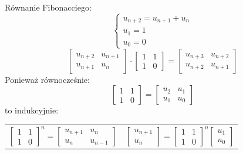 \documentclass[handout]{beamer}
\theoremstyle{definition}
\theoremstyle{named}
\begin{document}
\begin{frame}{Równanie Fibonacciego:}
\begin{equation*}
\begin{cases}
u_{n+2} = u_{n+1} + u_n \\
u_{1} = 1 \\
u_{0} = 0 
\end{cases}
\end{equation*}
\begin{equation*}
        \begin{bmatrix}
        u_{n+2} & u_{n+1} \\
        u_{n+1} & u_{n} 
        \end{bmatrix} 
        \cdot
        \begin{bmatrix}
        1 & 1\\
        1 & 0
        \end{bmatrix}
        = 
        \begin{bmatrix}
        u_{n+3} & u_{n+2}\\
        u_{n+2} & u_{n+1}
        \end{bmatrix}
\end{equation*}
Ponieważ równocześnie:
\begin{equation*}
    \begin{bmatrix}
    1 & 1 \\
    1 & 0 
    \end{bmatrix}= 
    \begin{bmatrix}
    u_2 & u_1 \\
    u_1 & u_0
    
    \end{bmatrix}
\end{equation*}
to indukcyjnie: 
\begin{table}[]
    \centering
    \begin{tabular}{c|c}
       \begin{equation*}
    
        \begin{bmatrix}
        1 & 1\\
        1 & 0
        \end{bmatrix}^n
        = 
        \begin{bmatrix}
        u_{n+1} & u_n\\
        u_{n} & u_{n-1}
        \end{bmatrix}

    \end{equation*}
&  
       \begin{equation*}
        \begin{bmatrix}
        u_{n+1} \\
        u_{n}
        \end{bmatrix}
        = 
        \begin{bmatrix}
        1 & 1\\
        1 & 0
        \end{bmatrix}^n
        \begin{bmatrix}
        u_1 \\
        u_0 
        \end{bmatrix}


\end{equation*}
\end{tabular}
\end{table}
\end{frame}
\end{document}
